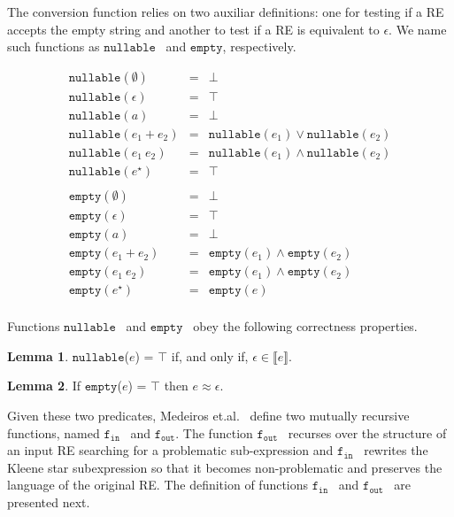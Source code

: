 \documentclass[review]{elsarticle}
\newcommand{\sembrackets}[1]{\ensuremath{\llbracket #1 \rrbracket}}
\newcommand{\nullable}{\ensuremath{\texttt{nullable}}}
\newcommand{\emptyy}{\ensuremath{\texttt{empty}}}
\newcommand{\fin}{\ensuremath{\texttt{f$_{\texttt{in}}$}}}
\newcommand{\fout}{\ensuremath{\texttt{f$_{\texttt{out}}$}}}
\theoremstyle{definition}
\newtheorem{Lemma}{Lemma}
\begin{document}
The conversion function relies on two auxiliar definitions: one for testing if a RE accepts the empty string and 
another to test if a RE is equivalent to $\epsilon$. We name such functions as \nullable~ and \emptyy, 
respectively.

\[
\begin{array}{lcl}
   \nullable(\emptyset) & = & \bot \\ 
   \nullable(\epsilon)  & = & \top \\
   \nullable(a)         & = & \bot \\ 
   \nullable(e_1 + e_2) & = & \nullable(e_1)\lor\nullable(e_2)\\
   \nullable(e_1\:e_2)  & = & \nullable(e_1)\land\nullable(e_2)\\
   \nullable(e ^\star)  & = & \top \\
   \\
   \emptyy(\emptyset)    & = & \bot \\ 
   \emptyy(\epsilon)     & = & \top \\
   \emptyy(a)            & = & \bot \\
   \emptyy(e_1 + e_2)    & = & \emptyy(e_1) \land \emptyy(e_2)\\
   \emptyy(e_1\:e_2)     & = & \emptyy(e_1) \land \emptyy(e_2)\\
   \emptyy(e ^\star)     & = & \emptyy(e)\\        
\end{array}
\]

Functions \nullable~ and \emptyy~ obey the following correctness properties.


\begin{Lemma}
   \nullable($e$) = $\top$ if, and only if, $\epsilon\in\sembrackets{e}$.
\end{Lemma}

\begin{Lemma}
   If \emptyy($e$) = $\top$ then $e \approx \epsilon$.
\end{Lemma}


Given these two predicates, Medeiros et.al.~\cite{Medeiros14} define two mutually recursive functions,
named \fin~ and \fout. The function \fout~ recurses over the structure of an input RE
searching for a problematic sub-expression and \fin~ rewrites the Kleene star subexpression
so that it becomes non-problematic and preserves the language of the original 
RE. The definition of functions \fin~ and \fout~ are presented next.
\end{document}
